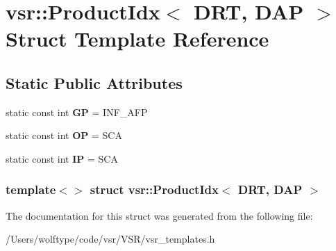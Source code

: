 \hypertarget{structvsr_1_1_product_idx_3_01_d_r_t_00_01_d_a_p_01_4}{\section{vsr\-:\-:Product\-Idx$<$ D\-R\-T, D\-A\-P $>$ Struct Template Reference}
\label{structvsr_1_1_product_idx_3_01_d_r_t_00_01_d_a_p_01_4}
}
\subsection*{Static Public Attributes}
\begin{DoxyCompactItemize}
\item 
\hypertarget{structvsr_1_1_product_idx_3_01_d_r_t_00_01_d_a_p_01_4_a94e4b88afb9713e1ef1ea40a8918e356}{static const int {\bfseries G\-P} = I\-N\-F\-\_\-\-A\-F\-P}\label{structvsr_1_1_product_idx_3_01_d_r_t_00_01_d_a_p_01_4_a94e4b88afb9713e1ef1ea40a8918e356}

\item 
\hypertarget{structvsr_1_1_product_idx_3_01_d_r_t_00_01_d_a_p_01_4_a334b6d3c646ad15e0f9936c2ebc1da2d}{static const int {\bfseries O\-P} = S\-C\-A}\label{structvsr_1_1_product_idx_3_01_d_r_t_00_01_d_a_p_01_4_a334b6d3c646ad15e0f9936c2ebc1da2d}

\item 
\hypertarget{structvsr_1_1_product_idx_3_01_d_r_t_00_01_d_a_p_01_4_a680dce4142cb25f12da7a1a89cbb0f50}{static const int {\bfseries I\-P} = S\-C\-A}\label{structvsr_1_1_product_idx_3_01_d_r_t_00_01_d_a_p_01_4_a680dce4142cb25f12da7a1a89cbb0f50}

\end{DoxyCompactItemize}
\subsubsection*{template$<$$>$ struct vsr\-::\-Product\-Idx$<$ D\-R\-T, D\-A\-P $>$}



The documentation for this struct was generated from the following file\-:\begin{DoxyCompactItemize}
\item 
/\-Users/wolftype/code/vsr/\-V\-S\-R/vsr\-\_\-templates.\-h\end{DoxyCompactItemize}
